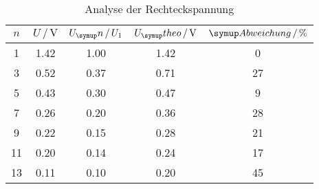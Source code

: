 \begin{table}
  \centering
  \begin{tabular}{c c c c c}
    \toprule
    $n$ & $U \,/\,\si{\volt}$ & $U_\su{n}\,/\,U_1$ & $U_\su{theo}\,/\,\si{\volt}$
    & $\su{Abweichung}\,/\, \%$ \\
    \midrule
    1   &   1.42  &   1.00  &   1.42    & 0  \\
    3   &   0.52  &   0.37  &   0.71    & 27 \\
    5   &   0.43  &   0.30  &   0.47    & 9  \\
    7   &   0.26  &   0.20  &   0.36    & 28  \\
    9   &   0.22  &   0.15  &   0.28    & 21  \\
   11   &   0.20  &   0.14  &   0.24    & 17  \\
   13   &   0.11  &   0.10  &   0.20    & 45  \\
    \bottomrule
  \end{tabular}
  \caption{Analyse der Rechteckspannung}
  \label{tab:anarecht}
\end{table}
